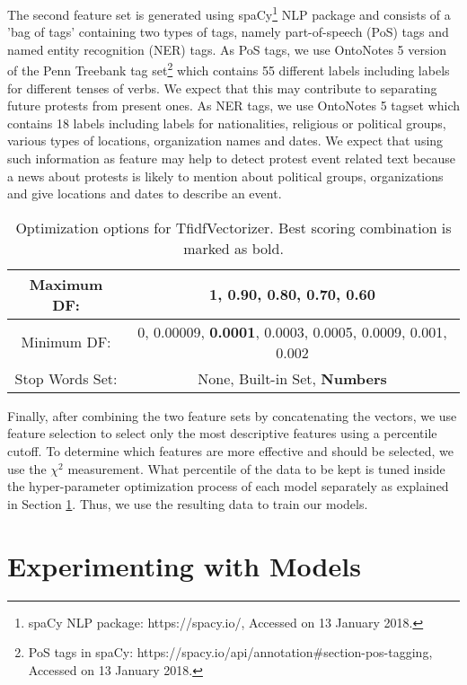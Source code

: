 \documentclass{article}
\begin{document}
The second feature set is generated using spaCy\footnote{spaCy NLP package: https://spacy.io/, Accessed on 13 January 2018.} NLP package and consists of a 'bag of tags' containing two types of tags, namely part-of-speech (PoS) tags and named entity recognition (NER) tags. As PoS tags, we use OntoNotes 5 version of the Penn Treebank tag set\footnote{PoS tags in spaCy: https://spacy.io/api/annotation#section-pos-tagging, Accessed on 13 January 2018.} which contains 55 different labels including labels for different tenses of verbs. We expect that this may contribute to separating future protests from present ones. As NER tags, we use OntoNotes 5 tagset which contains 18 labels including labels for nationalities, religious or political groups, various types of locations, organization names and dates. We expect that using such information as feature may help to detect protest event related text because a news about protests is likely to mention about political groups, organizations and give locations and dates to describe an event.

\begin{table}[h]
\centering
\begin{tabular}{|c|c|}
\hline
Maximum DF: & 1, 0.90, 0.80, 0.70, \textbf{0.60} \\
\hline
Minimum DF: & 0, 0.00009, \textbf{0.0001}, 0.0003, 0.0005, 0.0009, 0.001, 0.002 \\
\hline
Stop Words Set: & None, Built-in Set, \textbf{Numbers} \\
\hline
\end{tabular}
\caption{Optimization options for TfidfVectorizer. Best scoring combination is marked as bold.}
\label{tfidf-opt}
\end{table}


Finally, after combining the two feature sets by concatenating the vectors, we use feature selection to select only the most descriptive features using a percentile cutoff. To determine which features are more effective and should be selected, we use the $\chi^2$ measurement. What percentile of the data to be kept is tuned inside the hyper-parameter optimization process of each model separately as explained in Section \ref{exp-models}. Thus, we use the resulting data to train our models.

\section{Experimenting with Models}
\label{exp-models}
\end{document}
